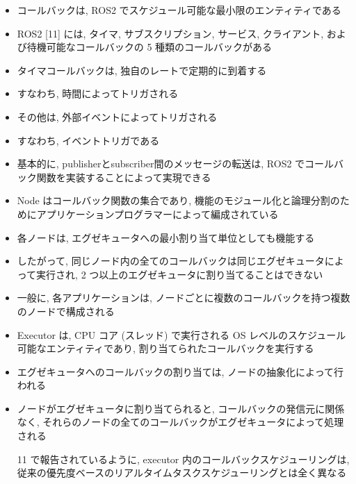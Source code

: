 \begin{frame}{}
    \begin{itemize}
        \item コールバックは, ROS2 でスケジュール可能な最小限のエンティティである
\item ROS2 [11] には, タイマ, サブスクリプション, サービス, クライアント, および待機可能なコールバックの 5 種類のコールバックがある
\item タイマコールバックは, 独自のレートで定期的に到着する
\item すなわち, 時間によってトリガされる
\item その他は, 外部イベントによってトリガされる
\item すなわち, イベントトリガである
\item 基本的に, publisherとsubscriber間のメッセージの転送は, ROS2 でコールバック関数を実装することによって実現できる
    \end{itemize}
\end{frame}

\begin{frame}{}
    \begin{itemize}
        \item Node はコールバック関数の集合であり, 機能のモジュール化と論理分割のためにアプリケーションプログラマーによって編成されている
\item 各ノードは, エグゼキュータへの最小割り当て単位としても機能する
\item したがって, 同じノード内の全てのコールバックは同じエグゼキュータによって実行され, 2 つ以上のエグゼキュータに割り当てることはできない
\item 一般に, 各アプリケーションは, ノードごとに複数のコールバックを持つ複数のノードで構成される
    \end{itemize}
\end{frame}

\begin{frame}{}
    \begin{itemize}
        \item Executor は, CPU コア (スレッド) で実行される OS レベルのスケジュール可能なエンティティであり, 割り当てられたコールバックを実行する
\item エグゼキュータへのコールバックの割り当ては, ノードの抽象化によって行われる
\item ノードがエグゼキュータに割り当てられると, コールバックの発信元に関係なく, それらのノードの全てのコールバックがエグゼキュータによって処理される
\item [11] で報告されているように, executor 内のコールバックスケジューリングは, 従来の優先度ベースのリアルタイムタスクスケジューリングとは全く異なる
    \end{itemize}
\end{frame}

